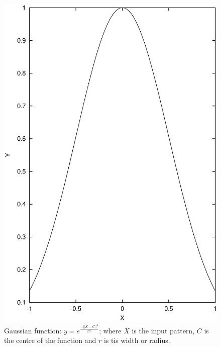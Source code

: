 \documentclass{article}
\begin{document}
\begin{figure}[!ht]
\includegraphics[width=120mm]{gausiana.eps}
\caption{Gaussian function: $y=e^{\frac{-||X-C||^2}{2r^2}}$; where $X$ is the input pattern, $C$ is the centre of the function and $r$ is tis width or radius.}
\label{fig:gaussian}
\end{figure}


\newpage
\clearpage
\end{document}
